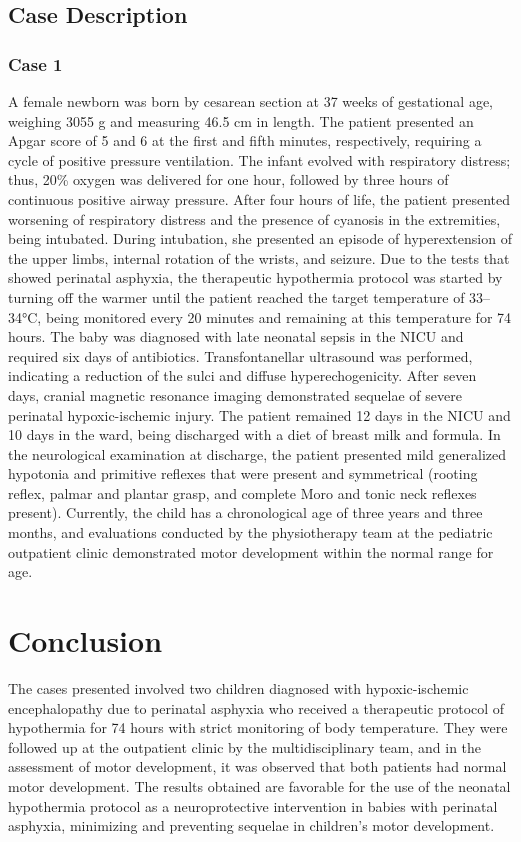 \documentclass[11pt,a4paper]{article}
\begin{document}
	\subsection{Case Description}
	\subsubsection{Case 1}
	A female newborn was born by cesarean section at 37 weeks of gestational age, weighing 3055 g and measuring 46.5 cm in length. The patient presented an Apgar score of 5 and 6 at the first and fifth minutes, respectively, requiring a cycle of positive pressure ventilation. The infant evolved with respiratory distress; thus, 20\% oxygen was delivered for one hour, followed by three hours of continuous positive airway pressure. After four hours of life, the patient presented worsening of respiratory distress and the presence of cyanosis in the extremities, being intubated. During intubation, she presented an episode of hyperextension of the upper limbs, internal rotation of the wrists, and seizure. Due to the tests that showed perinatal asphyxia, the therapeutic hypothermia protocol was started by turning off the warmer until the patient reached the target temperature of 33–34°C, being monitored every 20 minutes and remaining at this temperature for 74 hours. The baby was diagnosed with late neonatal sepsis in the NICU and required six days of antibiotics. Transfontanellar ultrasound was performed, indicating a reduction of the sulci and diffuse hyperechogenicity. After seven days, cranial magnetic resonance imaging demonstrated sequelae of severe perinatal hypoxic-ischemic injury. The patient remained 12 days in the NICU and 10 days in the ward, being discharged with a diet of breast milk and formula. In the neurological examination at discharge, the patient presented mild generalized hypotonia and primitive reflexes that were present and symmetrical (rooting reflex, palmar and plantar grasp, and complete Moro and tonic neck reflexes present). Currently, the child has a chronological age of three years and three months, and evaluations conducted by the physiotherapy team at the pediatric outpatient clinic demonstrated motor development within the normal range for age.
		
	\section{Conclusion}
	The cases presented involved two children diagnosed with hypoxic-ischemic encephalopathy due to perinatal asphyxia who received a therapeutic protocol of hypothermia for 74 hours with strict monitoring of body temperature. They were followed up at the outpatient clinic by the multidisciplinary team, and in the assessment of motor development, it was observed that both patients had normal motor development. The results obtained are favorable for the use of the neonatal hypothermia protocol as a neuroprotective intervention in babies with perinatal asphyxia, minimizing and preventing sequelae in children's motor development.
	
	\newpage
	
	\printbibliography[title=References]
		
\end{document}

